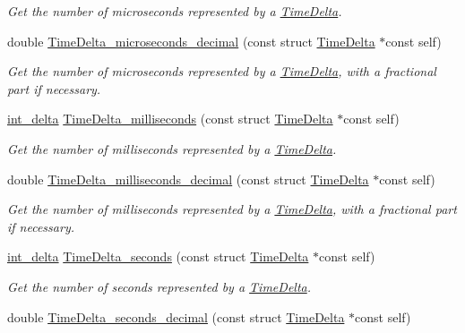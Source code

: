 \begin{DoxyCompactItemize}
\begin{DoxyCompactList}\small\item\em Get the number of microseconds represented by a \hyperlink{structTimeDelta}{Time\-Delta}. \end{DoxyCompactList}\item 
double \hyperlink{time-delta_8h_a7ded3314113cc38a3bc4034099f11ac1}{Time\-Delta\-\_\-microseconds\-\_\-decimal} (const struct \hyperlink{structTimeDelta}{Time\-Delta} $\ast$const self)
\begin{DoxyCompactList}\small\item\em Get the number of microseconds represented by a \hyperlink{structTimeDelta}{Time\-Delta}, with a fractional part if necessary. \end{DoxyCompactList}\item 
\hyperlink{types_8h_a8a67cf99971c5cfeeaa2380ba84a4c92}{int\-\_\-delta} \hyperlink{time-delta_8h_a7862999bc76772c28b49e682470c49da}{Time\-Delta\-\_\-milliseconds} (const struct \hyperlink{structTimeDelta}{Time\-Delta} $\ast$const self)
\begin{DoxyCompactList}\small\item\em Get the number of milliseconds represented by a \hyperlink{structTimeDelta}{Time\-Delta}. \end{DoxyCompactList}\item 
double \hyperlink{time-delta_8h_ac26e47832931d4fce592fbb6d49248aa}{Time\-Delta\-\_\-milliseconds\-\_\-decimal} (const struct \hyperlink{structTimeDelta}{Time\-Delta} $\ast$const self)
\begin{DoxyCompactList}\small\item\em Get the number of milliseconds represented by a \hyperlink{structTimeDelta}{Time\-Delta}, with a fractional part if necessary. \end{DoxyCompactList}\item 
\hyperlink{types_8h_a8a67cf99971c5cfeeaa2380ba84a4c92}{int\-\_\-delta} \hyperlink{time-delta_8h_ac63d87ff8c98e5659dd3984b2e4cb180}{Time\-Delta\-\_\-seconds} (const struct \hyperlink{structTimeDelta}{Time\-Delta} $\ast$const self)
\begin{DoxyCompactList}\small\item\em Get the number of seconds represented by a \hyperlink{structTimeDelta}{Time\-Delta}. \end{DoxyCompactList}\item 
double \hyperlink{time-delta_8h_ae4690765e21818a97d80b5e5f4334e73}{Time\-Delta\-\_\-seconds\-\_\-decimal} (const struct \hyperlink{structTimeDelta}{Time\-Delta} $\ast$const self)

\end{DoxyCompactItemize}
